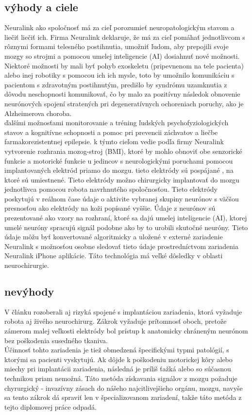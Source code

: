 \subsection{výhody a ciele}
Neuralink \cite{fiani2021examination} ako spoločnosť má za cieľ porozumieť neuropatologickým stavom a liečiť liečiť ich.
Firma Neuralink deklaruje, že má za cieľ pomáhať jednotlivcom s rôznymi formami telesného postihnutia, umožniť
 ľudom, aby prepojili svoje mozgy so strojmi a pomocou umelej inteligencie (AI) dosiahnuť nové možnosti.
 Niektoré možnosti by mali byť pohyb exoskeletu (pripevnenom na tele pacienta) alebo inej robotiky s pomocou ich ich mysle, toto by umožnilo komunikáciu s pacientom s zdravotným postihnutým, predišlo by syndrómu uzamknutia z dôvodu neschopnosti komunikovať, čo by malo za pozitívny následok obnovenie neurónových spojení stratených pri degeneratívnych ochoreniach
 poruchy, ako je Alzheimerova choroba.\\
 \tab[5 mm] ďalšími možnosťami monitorovanie a tréning ľudských psychofyziologických stavov a
 kognitívne schopnosti a pomoc pri prevencii záchvatov a liečbe farmakorezistentnej epilepsie. k týmto cieľom vedie podľa firmy Neuralink vytvorenie rozhrania mozog-stroj (BMI), ktoré by mohlo obnoviť obe senzorické funkcie
 a motorické funkcie u jedincov s neurologickými poruchami pomocou implantovaných elektród priamo do mozgu.  tieto elektródy sú pospájané , na ktoré sú umiestnené. Tieto elektródy možno chirurgicky implantovať do mozgu jednotlivca pomocou robota navrhnutého spoločnosťou.  Tieto elektródy poskytujú v reálnom čase údaje o aktivite vybranej skupiny neurónov s väčšou presnosťou ako elektródy na koži popísané vyššie. Údaje z neurónov sú prezentované ako vzory na rozhraní, ktoré sa dajú  umelej inteligencie (AI), ktorej umelé neuróny spracujú signál podobne ako by to urobili skutočné neuróny.  Tieto údaje môžu byť konvertované algoritmicky a uložené v
 externé zariadenie Neuralink s možnosťou osobne sledovať tieto údaje prostredníctvom zariadenia Neuralink iPhone
 aplikácie.  Táto technológia má veľké dôsledky v oblasti neurochirurgie.  
\subsection{nevýhody}
\tab[5 mm] V článku rozoberali \cite{fiani2021examination} aj rizyká spojené s implantáciou zariadenia, ktorá vyžaduje robota aj živého neurochirurg. Zákrok vyžaduje prítomnosť oboch, pretože zámerom malej veľkosti elektródy bol prístup k anatomicky chráneným neurónom bez poškodenia susedného tkaniva. \\
\tab[5 mm] Účinnosť tohto zariadenia je tiež obmedzená špecifickými typmi patológií, s ktorými sa pacienti vyskytujú.
 Ak dôjde k poškodeniu motorickej kôry alebo miechy pri implantácii zariadenia, následná  je príliš ťažká alebo so súčasnou technikou priam nemožná. Táto metóda získavania signálov z mozgu požaduje chyrurgický - invazívny zásach do nášeho najcitlivejšieho orgánu, mozgu, navyše sa tento zákrok dá spraviť len v špecializovanom zariadení, takže táto metóda z tejto diplomovej práce odpadá.  
